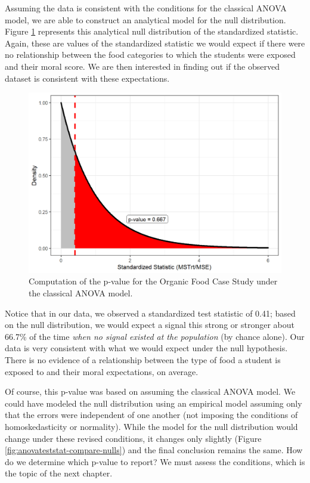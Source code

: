 \documentclass[
]{book}
\theoremstyle{plain}
\theoremstyle{mydefn}
\theoremstyle{myexmpl}
\theoremstyle{remark}
\begin{document}
Assuming the data is consistent with the conditions for the classical ANOVA model, we are able to construct an analytical model for the null distribution. Figure \ref{fig:anovateststat-pvalue} represents this analytical null distribution of the standardized statistic. Again, these are values of the standardized statistic we would expect if there were no relationship between the food categories to which the students were exposed and their moral score. We are then interested in finding out if the observed dataset is consistent with these expectations.

\begin{figure}

{\centering \includegraphics[width=0.8\linewidth]{./Images/anovateststat-pvalue-1} 

}

\caption{Computation of the p-value for the Organic Food Case Study under the classical ANOVA model.}\label{fig:anovateststat-pvalue}
\end{figure}

Notice that in our data, we observed a standardized test statistic of 0.41; based on the null distribution, we would expect a signal this strong or stronger about 66.7\% of the time \emph{when no signal existed at the population} (by chance alone). Our data is very consistent with what we would expect under the null hypothesis. There is no evidence of a relationship between the type of food a student is exposed to and their moral expectations, on average.

Of course, this p-value was based on assuming the classical ANOVA model. We could have modeled the null distribution using an empirical model assuming only that the errors were independent of one another (not imposing the conditions of homoskedasticity or normality). While the model for the null distribution would change under these revised conditions, it changes only slightly (Figure \ref{fig:anovateststat-compare-nulls}) and the final conclusion remains the same. How do we determine which p-value to report? We must assess the conditions, which is the topic of the next chapter.
\end{document}
